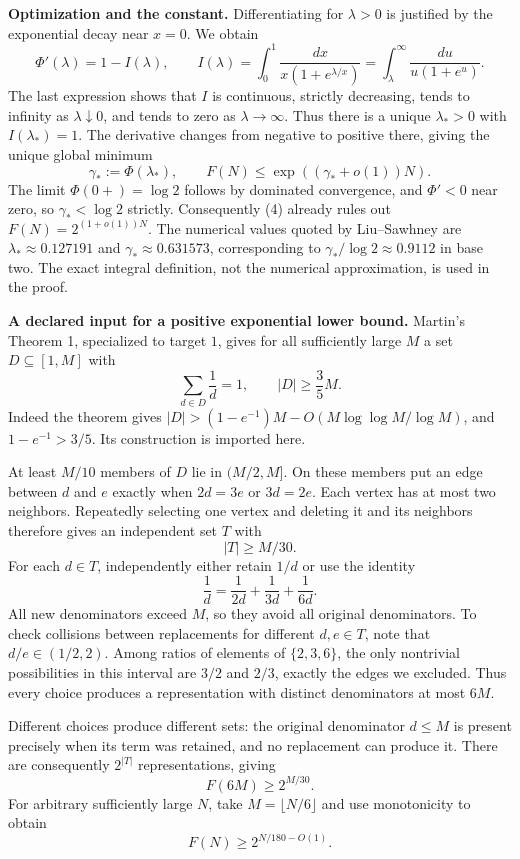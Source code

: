 \textbf{Optimization and the constant.} Differentiating for $\lambda>0$ is justified by the exponential decay near $x=0$. We obtain
\[
\Phi'(\lambda)=1-I(\lambda),\qquad
I(\lambda)=\int_0^1\frac{dx}{x(1+e^{\lambda/x})}
=\int_\lambda^\infty\frac{du}{u(1+e^u)}.
\tag{3}
\]
The last expression shows that $I$ is continuous, strictly decreasing, tends to infinity as $\lambda\downarrow0$, and tends to zero as $\lambda\to\infty$. Thus there is a unique $\lambda_*>0$ with $I(\lambda_*)=1$. The derivative changes from negative to positive there, giving the unique global minimum
\[
\gamma_*:=\Phi(\lambda_*),\qquad
F(N)\leq\exp((\gamma_*+o(1))N).
\tag{4}
\]
The limit $\Phi(0+)=\log2$ follows by dominated convergence, and $\Phi'<0$ near zero, so $\gamma_*<\log2$ strictly. Consequently (4) already rules out $F(N)=2^{(1+o(1))N}$. The numerical values quoted by Liu--Sawhney are $\lambda_*\approx0.127191$ and $\gamma_*\approx0.631573$, corresponding to $\gamma_*/\log2\approx0.9112$ in base two. The exact integral definition, not the numerical approximation, is used in the proof.

\textbf{A declared input for a positive exponential lower bound.} Martin's Theorem 1, specialized to target $1$, gives for all sufficiently large $M$ a set $D\subseteq[1,M]$ with
\[
\sum_{d\in D}\frac1d=1,\qquad |D|\geq\frac35M.
\tag{5}
\]
Indeed the theorem gives $|D|>(1-e^{-1})M-O(M\log\log M/\log M)$, and $1-e^{-1}>3/5$. Its construction is imported here.

At least $M/10$ members of $D$ lie in $(M/2,M]$. On these members put an edge between $d$ and $e$ exactly when $2d=3e$ or $3d=2e$. Each vertex has at most two neighbors. Repeatedly selecting one vertex and deleting it and its neighbors therefore gives an independent set $T$ with
\[
|T|\geq M/30.
\tag{6}
\]
For each $d\in T$, independently either retain $1/d$ or use the identity
\[
\frac1d=\frac1{2d}+\frac1{3d}+\frac1{6d}.
\tag{7}
\]
All new denominators exceed $M$, so they avoid all original denominators. To check collisions between replacements for different $d,e\in T$, note that $d/e\in(1/2,2)$. Among ratios of elements of $\{2,3,6\}$, the only nontrivial possibilities in this interval are $3/2$ and $2/3$, exactly the edges we excluded. Thus every choice produces a representation with distinct denominators at most $6M$.

Different choices produce different sets: the original denominator $d\leq M$ is present precisely when its term was retained, and no replacement can produce it. There are consequently $2^{|T|}$ representations, giving
\[
F(6M)\geq2^{M/30}.
\]
For arbitrary sufficiently large $N$, take $M=\lfloor N/6\rfloor$ and use monotonicity to obtain
\[
F(N)\geq2^{N/180-O(1)}.
\tag{8}
\]

